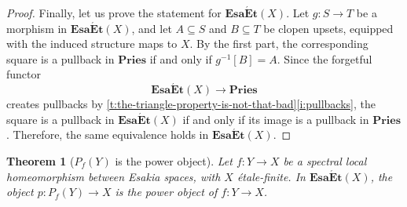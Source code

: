 \documentclass[12pt]{amsart}
\theoremstyle{plain}
\newtheorem{theorem}{Theorem}[section]
\theoremstyle{definition}
\newcommand{\cat}[1]{\mathbf{#1}}
\newcommand{\Pries}{\cat{Pries}}
\newcommand{\EsaEt}{\cat{Esa\acute{E}t}}
\begin{document}
\begin{proof}
    Finally, let us prove the statement for $\EsaEt(X)$. Let $g\colon S\to T$ be a morphism in $\EsaEt(X)$, and let $A\subseteq S$ and $B\subseteq T$ be clopen upsets, equipped with the induced structure maps to $X$. By the first part, the corresponding square is a pullback in $\Pries$ if and only if $g^{-1}[B]=A$. Since the forgetful functor
    \[
    \EsaEt(X)\longrightarrow \Pries
    \]
    creates pullbacks by \cref{t:the-triangle-property-is-not-that-bad}\eqref{i:pullbacks}, the square is a pullback in $\EsaEt(X)$ if and only if its image is a pullback in $\Pries$. Therefore, the same equivalence holds in $\EsaEt(X)$.
\end{proof}



\begin{theorem}[$P_f(Y)$ is the power object] \label{thm: Power object theorem}
    Let $f \colon Y \to X$ be a spectral local homeomorphism between Esakia spaces, with $X$ étale-finite.
    In $\EsaEt(X)$, the object $p \colon P_{f}(Y) \to X$ is the power object of $f \colon Y\to X$.
\end{theorem}
\end{document}
